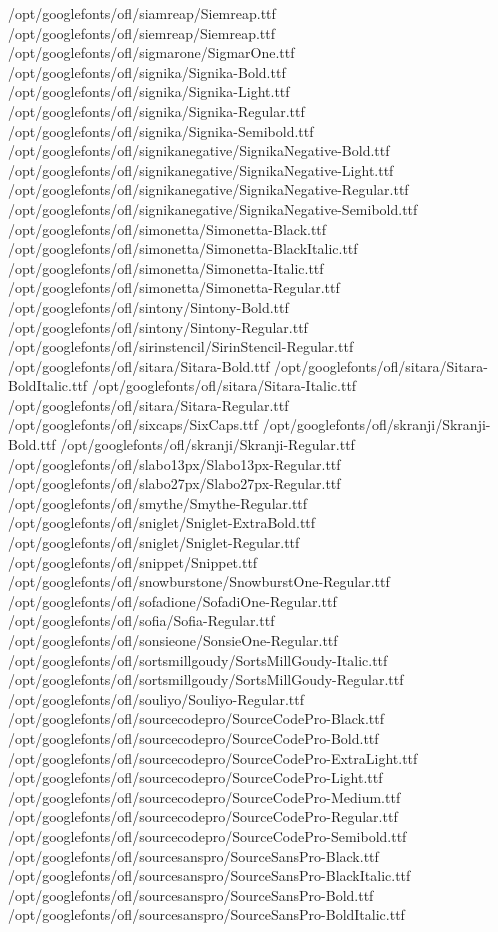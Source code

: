/opt/googlefonts/ofl/siamreap/Siemreap.ttf
/opt/googlefonts/ofl/siemreap/Siemreap.ttf
/opt/googlefonts/ofl/sigmarone/SigmarOne.ttf
/opt/googlefonts/ofl/signika/Signika-Bold.ttf
/opt/googlefonts/ofl/signika/Signika-Light.ttf
/opt/googlefonts/ofl/signika/Signika-Regular.ttf
/opt/googlefonts/ofl/signika/Signika-Semibold.ttf
/opt/googlefonts/ofl/signikanegative/SignikaNegative-Bold.ttf
/opt/googlefonts/ofl/signikanegative/SignikaNegative-Light.ttf
/opt/googlefonts/ofl/signikanegative/SignikaNegative-Regular.ttf
/opt/googlefonts/ofl/signikanegative/SignikaNegative-Semibold.ttf
/opt/googlefonts/ofl/simonetta/Simonetta-Black.ttf
/opt/googlefonts/ofl/simonetta/Simonetta-BlackItalic.ttf
/opt/googlefonts/ofl/simonetta/Simonetta-Italic.ttf
/opt/googlefonts/ofl/simonetta/Simonetta-Regular.ttf
/opt/googlefonts/ofl/sintony/Sintony-Bold.ttf
/opt/googlefonts/ofl/sintony/Sintony-Regular.ttf
/opt/googlefonts/ofl/sirinstencil/SirinStencil-Regular.ttf
/opt/googlefonts/ofl/sitara/Sitara-Bold.ttf
/opt/googlefonts/ofl/sitara/Sitara-BoldItalic.ttf
/opt/googlefonts/ofl/sitara/Sitara-Italic.ttf
/opt/googlefonts/ofl/sitara/Sitara-Regular.ttf
/opt/googlefonts/ofl/sixcaps/SixCaps.ttf
/opt/googlefonts/ofl/skranji/Skranji-Bold.ttf
/opt/googlefonts/ofl/skranji/Skranji-Regular.ttf
/opt/googlefonts/ofl/slabo13px/Slabo13px-Regular.ttf
/opt/googlefonts/ofl/slabo27px/Slabo27px-Regular.ttf
/opt/googlefonts/ofl/smythe/Smythe-Regular.ttf
/opt/googlefonts/ofl/sniglet/Sniglet-ExtraBold.ttf
/opt/googlefonts/ofl/sniglet/Sniglet-Regular.ttf
/opt/googlefonts/ofl/snippet/Snippet.ttf
/opt/googlefonts/ofl/snowburstone/SnowburstOne-Regular.ttf
/opt/googlefonts/ofl/sofadione/SofadiOne-Regular.ttf
/opt/googlefonts/ofl/sofia/Sofia-Regular.ttf
/opt/googlefonts/ofl/sonsieone/SonsieOne-Regular.ttf
/opt/googlefonts/ofl/sortsmillgoudy/SortsMillGoudy-Italic.ttf
/opt/googlefonts/ofl/sortsmillgoudy/SortsMillGoudy-Regular.ttf
/opt/googlefonts/ofl/souliyo/Souliyo-Regular.ttf
/opt/googlefonts/ofl/sourcecodepro/SourceCodePro-Black.ttf
/opt/googlefonts/ofl/sourcecodepro/SourceCodePro-Bold.ttf
/opt/googlefonts/ofl/sourcecodepro/SourceCodePro-ExtraLight.ttf
/opt/googlefonts/ofl/sourcecodepro/SourceCodePro-Light.ttf
/opt/googlefonts/ofl/sourcecodepro/SourceCodePro-Medium.ttf
/opt/googlefonts/ofl/sourcecodepro/SourceCodePro-Regular.ttf
/opt/googlefonts/ofl/sourcecodepro/SourceCodePro-Semibold.ttf
/opt/googlefonts/ofl/sourcesanspro/SourceSansPro-Black.ttf
/opt/googlefonts/ofl/sourcesanspro/SourceSansPro-BlackItalic.ttf
/opt/googlefonts/ofl/sourcesanspro/SourceSansPro-Bold.ttf
/opt/googlefonts/ofl/sourcesanspro/SourceSansPro-BoldItalic.ttf
